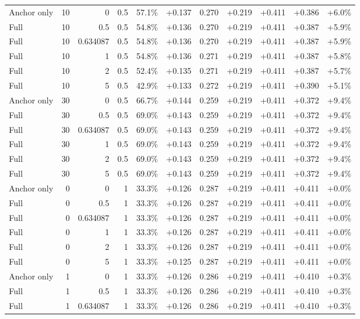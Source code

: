 \begin{table}[htbp]
\begin{tabular}{lrrrccccccc}
Anchor only & 10 & 0 & 0.5 & 57.1\% & +0.137 & 0.270 & +0.219 & +0.411 & +0.386 & +6.0\% \\
Full & 10 & 0.5 & 0.5 & 54.8\% & +0.136 & 0.270 & +0.219 & +0.411 & +0.387 & +5.9\% \\
Full & 10 & 0.634087 & 0.5 & 54.8\% & +0.136 & 0.270 & +0.219 & +0.411 & +0.387 & +5.9\% \\
Full & 10 & 1 & 0.5 & 54.8\% & +0.136 & 0.271 & +0.219 & +0.411 & +0.387 & +5.8\% \\
Full & 10 & 2 & 0.5 & 52.4\% & +0.135 & 0.271 & +0.219 & +0.411 & +0.387 & +5.7\% \\
Full & 10 & 5 & 0.5 & 42.9\% & +0.133 & 0.272 & +0.219 & +0.411 & +0.390 & +5.1\% \\
Anchor only & 30 & 0 & 0.5 & 66.7\% & +0.144 & 0.259 & +0.219 & +0.411 & +0.372 & +9.4\% \\
Full & 30 & 0.5 & 0.5 & 69.0\% & +0.143 & 0.259 & +0.219 & +0.411 & +0.372 & +9.4\% \\
Full & 30 & 0.634087 & 0.5 & 69.0\% & +0.143 & 0.259 & +0.219 & +0.411 & +0.372 & +9.4\% \\
Full & 30 & 1 & 0.5 & 69.0\% & +0.143 & 0.259 & +0.219 & +0.411 & +0.372 & +9.4\% \\
Full & 30 & 2 & 0.5 & 69.0\% & +0.143 & 0.259 & +0.219 & +0.411 & +0.372 & +9.4\% \\
Full & 30 & 5 & 0.5 & 69.0\% & +0.143 & 0.259 & +0.219 & +0.411 & +0.372 & +9.4\% \\
Anchor only & 0 & 0 & 1 & 33.3\% & +0.126 & 0.287 & +0.219 & +0.411 & +0.411 & +0.0\% \\
Full & 0 & 0.5 & 1 & 33.3\% & +0.126 & 0.287 & +0.219 & +0.411 & +0.411 & +0.0\% \\
Full & 0 & 0.634087 & 1 & 33.3\% & +0.126 & 0.287 & +0.219 & +0.411 & +0.411 & +0.0\% \\
Full & 0 & 1 & 1 & 33.3\% & +0.126 & 0.287 & +0.219 & +0.411 & +0.411 & +0.0\% \\
Full & 0 & 2 & 1 & 33.3\% & +0.126 & 0.287 & +0.219 & +0.411 & +0.411 & +0.0\% \\
Full & 0 & 5 & 1 & 33.3\% & +0.125 & 0.287 & +0.219 & +0.411 & +0.411 & +0.0\% \\
Anchor only & 1 & 0 & 1 & 33.3\% & +0.126 & 0.286 & +0.219 & +0.411 & +0.410 & +0.3\% \\
Full & 1 & 0.5 & 1 & 33.3\% & +0.126 & 0.286 & +0.219 & +0.411 & +0.410 & +0.3\% \\
Full & 1 & 0.634087 & 1 & 33.3\% & +0.126 & 0.286 & +0.219 & +0.411 & +0.410 & +0.3\% \\

\end{tabular}
\end{table}
